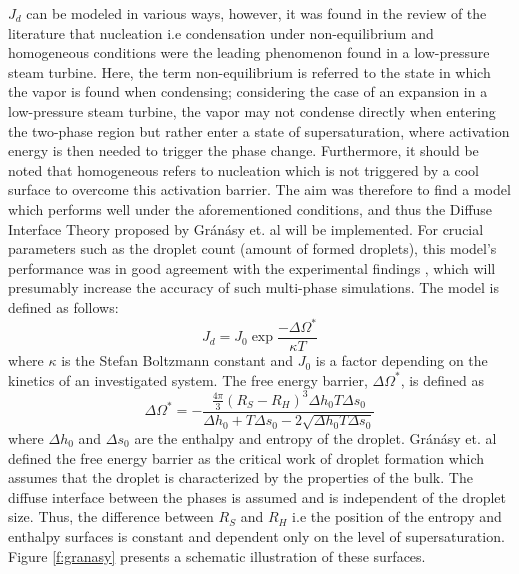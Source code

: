 \documentclass[12pt]{article}
\begin{document}
$J_{d}$ can be modeled in various ways, however, it was found in the review of the literature that nucleation i.e condensation under non-equilibrium and homogeneous conditions were the leading phenomenon found in a low-pressure steam turbine. Here, the term non-equilibrium is referred to the state in which the vapor is found when condensing; considering the case of an expansion in a low-pressure steam turbine, the vapor may not condense directly when entering the two-phase region but rather enter a state of supersaturation, where activation energy is then needed to trigger the phase change. Furthermore, it should be noted that homogeneous refers to nucleation which is not triggered by a cool surface to overcome this activation barrier. The aim was therefore to find a model which performs well under the aforementioned conditions, and thus the Diffuse Interface Theory proposed by Gránásy et. al \cite{granasy1993diffuse} will be implemented. For crucial parameters such as the droplet count (amount of formed droplets), this model's performance was in good agreement with the experimental findings \cite{granasy1993diffuse}, which will presumably increase the accuracy of such multi-phase simulations. The model is defined as follows:
\begin{equation}
    J_{d}=J_{0}\exp{\frac{-\Delta \Omega^*}{\kappa T}}
    \label{eq:nucleation}
\end{equation}  
where $\kappa$ is the Stefan Boltzmann constant and $J_{0}$ is a factor depending on the kinetics of an investigated system. The free energy barrier, $\Delta\Omega^*$, is defined as
\begin{equation}
    \Delta\Omega^*=-\frac{\frac{4\pi}{3}(R_{S}-R_{H})^{3}\Delta h_{0}T \Delta s_{0}}{\Delta h_{0}+T \Delta s_{0}-2\sqrt{\Delta h_{0}T \Delta s_{0}}} 
\label{eq:critical_drop}
\end{equation}
where $\Delta h_{0}$ and $\Delta s_{0}$ are the enthalpy and entropy of the droplet. Gránásy et. al defined the free energy barrier as the critical work of droplet formation which assumes that the droplet is characterized by the properties of the bulk. The diffuse interface between the phases is assumed and is independent of the droplet size. Thus, the difference between $R_{S}$ and $R_{H}$ i.e the position of the entropy and enthalpy surfaces is constant and dependent only on the level of supersaturation. Figure \ref{f:granasy} presents a schematic illustration of these surfaces. 
\end{document}
